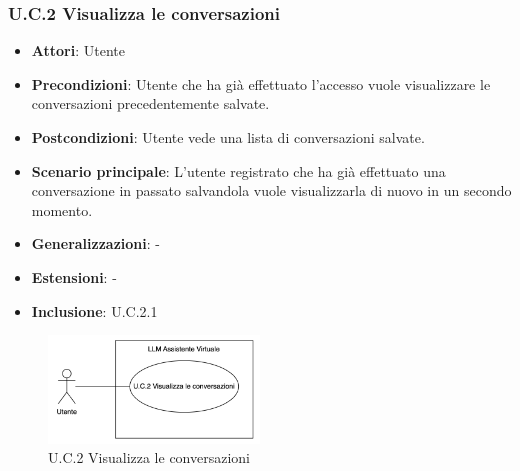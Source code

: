 \subsubsection{U.C.2 Visualizza le conversazioni}
\begin{itemize}
    \item \textbf{Attori}: Utente
    \item \textbf{Precondizioni}: Utente che ha già effettuato l’accesso vuole visualizzare le conversazioni precedentemente salvate.
    \item \textbf{Postcondizioni}: Utente vede una lista di conversazioni salvate.
    \item \textbf{Scenario principale}: L’utente registrato che ha già effettuato una conversazione in passato salvandola vuole visualizzarla di nuovo in un secondo momento.
    \item \textbf{Generalizzazioni}: -
    \item \textbf{Estensioni}: -
    \item \textbf{Inclusione}: U.C.2.1
\end{itemize}
\begin{figure}[H]
    \centering
    \includegraphics[width=0.5\textwidth]{img/UC2.png}
    \caption{U.C.2 Visualizza le conversazioni}
\end{figure}
